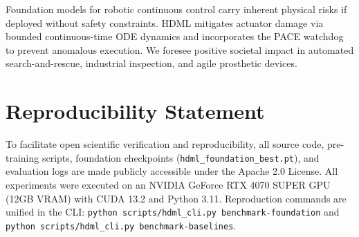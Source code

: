 \documentclass{article}
\begin{document}
Foundation models for robotic continuous control carry inherent physical risks if deployed without safety constraints. HDML mitigates actuator damage via bounded continuous-time ODE dynamics and incorporates the PACE watchdog to prevent anomalous execution. We foresee positive societal impact in automated search-and-rescue, industrial inspection, and agile prosthetic devices.

\section{Reproducibility Statement}
\label{sec:reproducibility}

To facilitate open scientific verification and reproducibility, all source code, pre-training scripts, foundation checkpoints (\texttt{hdml\_foundation\_best.pt}), and evaluation logs are made publicly accessible under the Apache 2.0 License. All experiments were executed on an NVIDIA GeForce RTX 4070 SUPER GPU (12GB VRAM) with CUDA 13.2 and Python 3.11. Reproduction commands are unified in the CLI: \texttt{python scripts/hdml\_cli.py benchmark-foundation} and \texttt{python scripts/hdml\_cli.py benchmark-baselines}.



\end{document}
